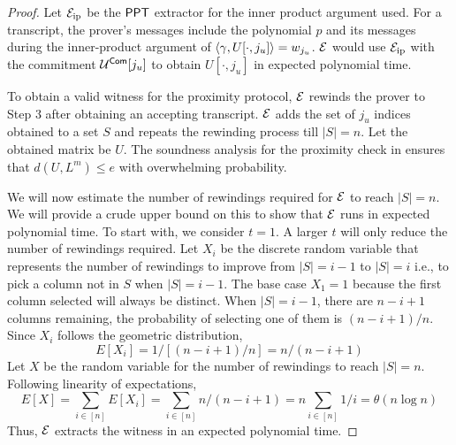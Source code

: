 \begin{proof}
Let $\mathcal{E}_{\mathrm{ip}}$ be the $\mathsf{PPT}$ extractor for the inner product argument used. For a transcript, the prover's messages include the polynomial $p$ and its messages during the inner-product argument of $\langle \gamma,U[\cdot, j_u]\rangle = w_{j_u}$.
$\mathcal{E}$ would use $\mathcal{E}_{\mathrm{ip}}$ with the commitment $\mathcal{U}^{\mathsf{Com}}[j_u]$ to obtain $U[\cdot,j_u]$ in expected polynomial time. 

To obtain a valid witness for the proximity protocol, $\mathcal{E}$ rewinds the prover to Step 3 after obtaining an accepting transcript. $\mathcal{E}$ adds the set of $j_u$ indices obtained to a set $S$ and repeats the rewinding process till $|S| = n$. Let the obtained matrix be $U$.
The soundness analysis for the proximity check in \cite{ligero} ensures that  $d(U, L^m) \leq e$ with overwhelming probability. 

We will now estimate the number of rewindings required for $\mathcal{E}$ to reach $|S| = n$. We will provide a crude upper bound on this to show that $\mathcal{E}$ runs in expected polynomial time. To start with, we consider $t=1$. A larger $t$ will only reduce the number of rewindings required. Let $X_i$ be the discrete random variable that represents the number of rewindings to improve from $|S| = i-1$ to $|S| = i$ i.e., to pick a column not in $S$ when $|S| = i-1$. The base case $X_1=1$ because the first column selected will always be distinct. When $|S| = i-1$, there are $n-i+1$ columns remaining, the probability of selecting one of them is $(n-i+1)/n$. Since $X_i$ follows the geometric distribution, 
\[
E[X_i] = 1/ [(n-i+1)/n] = n/ (n-i+1)
\]
Let $X$ be the random variable for the number of rewindings to reach $|S| = n$.
Following linearity of expectations, 
\[
E[X] = \sum_{i \in [n]} E[X_i] = \sum_{i \in [n]} n/ (n-i+1) = n \sum_{i \in [n]} 1/i = \theta (n \log n) 
\]
Thus, $\mathcal{E}$ extracts the witness in an expected polynomial time.
\end{proof}

